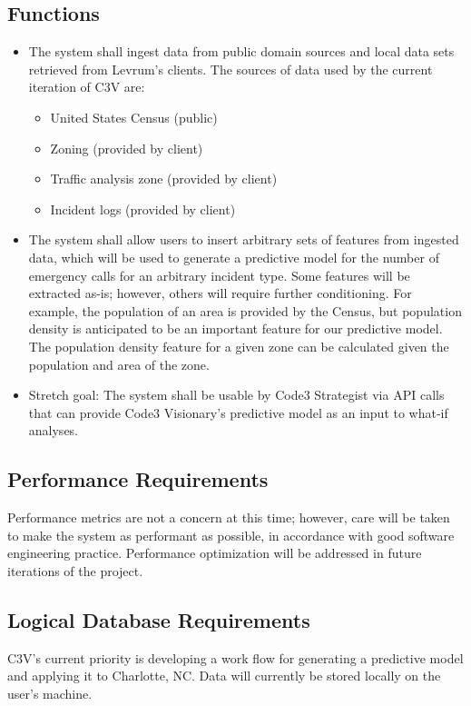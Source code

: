 \documentclass[onecolumn, draftclsnofoot,10pt, compsoc]{IEEEtran}
\begin{document}
    \subsection{Functions}
    \begin{itemize}
        \item The system shall ingest data from public domain sources and local data sets retrieved from Levrum's clients.
        The sources of data used by the current iteration of C3V are:
        \begin{itemize}
            \item United States Census (public)
            \item Zoning (provided by client)
            \item Traffic analysis zone (provided by client)
            \item Incident logs (provided by client)
        \end{itemize}
        \item The system shall allow users to insert arbitrary sets of features from ingested data, which will be used to generate a predictive model for the number of emergency calls for an arbitrary incident type.
        Some features will be extracted as-is; however, others will require further conditioning. For example, the population of an area is provided by the Census, but population density is anticipated to be an important feature for our predictive model. The population density feature for a given zone can be calculated given the population and area of the zone.
        \item Stretch goal: The system shall be usable by Code3 Strategist via API calls that can provide Code3 Visionary's predictive model as an input to what-if analyses.
    \end{itemize}
    
    \subsection{Performance Requirements}
    Performance metrics are not a concern at this time; however, care will be taken to make the system as performant as possible, in accordance with good software engineering practice. 
    Performance optimization will be addressed in future iterations of the project. 
    
    \subsection{Logical Database Requirements}
    C3V's current priority is developing a work flow for generating a predictive model and applying it to Charlotte, NC.
    Data will currently be stored locally on the user's machine.
    
\end{document}
